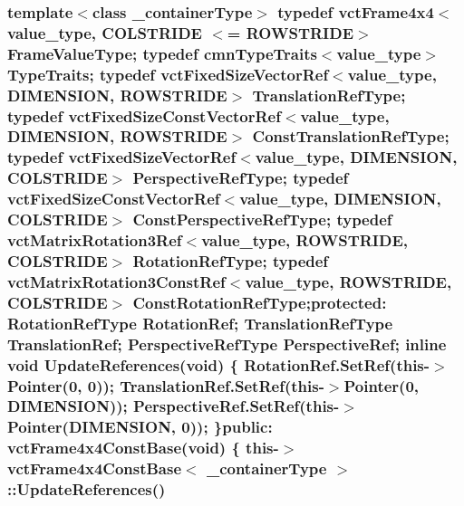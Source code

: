 \subsubsection[{Update\+References}]{\setlength{\rightskip}{0pt plus 5cm}template$<$class \+\_\+container\+Type$>$ typedef {\bf vct\+Frame4x4}$<$value\+\_\+type, {\bf C\+O\+L\+S\+T\+R\+I\+D\+E} $<$= {\bf R\+O\+W\+S\+T\+R\+I\+D\+E}$>$ Frame\+Value\+Type; typedef {\bf cmn\+Type\+Traits}$<$value\+\_\+type$>$ Type\+Traits; typedef {\bf vct\+Fixed\+Size\+Vector\+Ref}$<$value\+\_\+type, {\bf D\+I\+M\+E\+N\+S\+I\+O\+N}, {\bf R\+O\+W\+S\+T\+R\+I\+D\+E}$>$ Translation\+Ref\+Type; typedef {\bf vct\+Fixed\+Size\+Const\+Vector\+Ref}$<$value\+\_\+type, {\bf D\+I\+M\+E\+N\+S\+I\+O\+N}, {\bf R\+O\+W\+S\+T\+R\+I\+D\+E}$>$ Const\+Translation\+Ref\+Type; typedef {\bf vct\+Fixed\+Size\+Vector\+Ref}$<$value\+\_\+type, {\bf D\+I\+M\+E\+N\+S\+I\+O\+N}, {\bf C\+O\+L\+S\+T\+R\+I\+D\+E}$>$ Perspective\+Ref\+Type; typedef {\bf vct\+Fixed\+Size\+Const\+Vector\+Ref}$<$value\+\_\+type, {\bf D\+I\+M\+E\+N\+S\+I\+O\+N}, {\bf C\+O\+L\+S\+T\+R\+I\+D\+E}$>$ Const\+Perspective\+Ref\+Type; typedef {\bf vct\+Matrix\+Rotation3\+Ref}$<$value\+\_\+type, {\bf R\+O\+W\+S\+T\+R\+I\+D\+E}, {\bf C\+O\+L\+S\+T\+R\+I\+D\+E}$>$ Rotation\+Ref\+Type; typedef {\bf vct\+Matrix\+Rotation3\+Const\+Ref}$<$value\+\_\+type, {\bf R\+O\+W\+S\+T\+R\+I\+D\+E}, {\bf C\+O\+L\+S\+T\+R\+I\+D\+E}$>$ Const\+Rotation\+Ref\+Type;protected\+: Rotation\+Ref\+Type Rotation\+Ref; Translation\+Ref\+Type Translation\+Ref; Perspective\+Ref\+Type Perspective\+Ref; inline void Update\+References(void) \{ Rotation\+Ref.\+Set\+Ref(this-\/$>$Pointer(0, 0)); Translation\+Ref.\+Set\+Ref(this-\/$>$Pointer(0, {\bf D\+I\+M\+E\+N\+S\+I\+O\+N})); Perspective\+Ref.\+Set\+Ref(this-\/$>$Pointer({\bf D\+I\+M\+E\+N\+S\+I\+O\+N}, 0)); \}public\+: {\bf vct\+Frame4x4\+Const\+Base}(void) \{ this-\/$>$ {\bf vct\+Frame4x4\+Const\+Base}$<$ \+\_\+container\+Type $>$\+::Update\+References()}\label{classvct_frame4x4_const_base_aabe7499444284102317fe1af3a3f6978}


